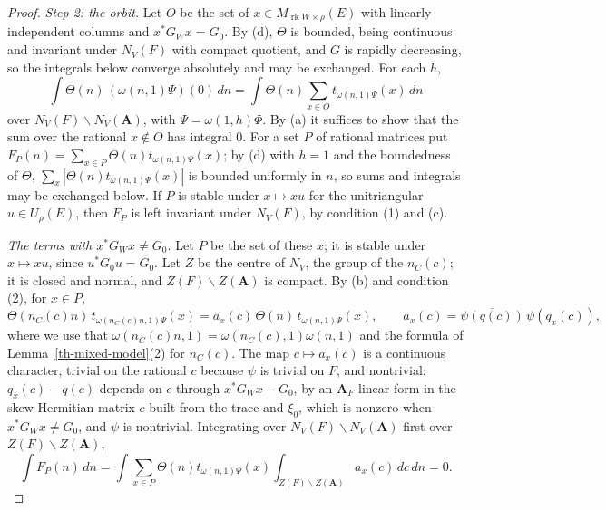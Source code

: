 \begin{proof}
\emph{Step 2: the orbit.} Let $O$ be the set of
$x\in M_{\operatorname{rk}W\times\rho}(E)$ with linearly independent columns
and $x^*G_Wx=G_0$. By (d), $\Theta$ is bounded, being continuous and invariant
under $N_V(F)$ with compact quotient, and $G$ is rapidly decreasing, so the
integrals below converge absolutely and may be exchanged. For each $h$,
\[
\int\Theta(n)\,(\omega(n,1)\Psi)(0)\,dn=\int\Theta(n)\sum_{x\in O}t_{\omega(n,1)\Psi}(x)\,dn
\]
over $N_V(F)\backslash N_V(\mathbf A)$, with $\Psi=\omega(1,h)\Phi$. By (a) it
suffices to show that the sum over the rational $x\notin O$ has integral $0$.
For a set $P$ of rational matrices put
$F_P(n)=\sum_{x\in P}\Theta(n)t_{\omega(n,1)\Psi}(x)$; by (d) with $h=1$ and the
boundedness of $\Theta$, $\sum_x|\Theta(n)t_{\omega(n,1)\Psi}(x)|$ is bounded
uniformly in $n$, so sums and integrals may be exchanged below. If $P$ is
stable under $x\mapsto xu$ for the unitriangular $u\in U_\rho(E)$, then $F_P$ is
left invariant under $N_V(F)$, by condition (1) and (c).

\emph{The terms with $x^*G_Wx\neq G_0$.} Let $P$ be the set of these $x$; it is
stable under $x\mapsto xu$, since $u^*G_0u=G_0$. Let $Z$ be the centre of
$N_V$, the group of the $n_C(c)$; it is closed and normal, and $Z(F)\backslash
Z(\mathbf A)$ is compact. By (b) and condition (2), for $x\in P$,
\[
\Theta(n_C(c)n)\,t_{\omega(n_C(c)n,1)\Psi}(x)=a_x(c)\,\Theta(n)\,t_{\omega(n,1)\Psi}(x),\qquad
a_x(c)=\overline{\psi(q(c))}\,\psi(q_x(c)),
\]
where we use that $\omega(n_C(c)n,1)=\omega(n_C(c),1)\omega(n,1)$ and the formula
of Lemma~\ref{th-mixed-model}(2) for $n_C(c)$. The map $c\mapsto a_x(c)$ is a
continuous character, trivial on the rational $c$ because $\psi$ is trivial on
$F$, and nontrivial: $q_x(c)-q(c)$ depends on $c$ through
$x^*G_Wx-G_0$, by an $\mathbf A_F$-linear form in the skew-Hermitian matrix $c$
built from the trace and $\xi_0$, which is nonzero when $x^*G_Wx\neq G_0$, and
$\psi$ is nontrivial. Integrating over
$N_V(F)\backslash N_V(\mathbf A)$ first over $Z(F)\backslash Z(\mathbf A)$,
\[
\int F_P(n)\,dn=\int\sum_{x\in P}\Theta(n)t_{\omega(n,1)\Psi}(x)\int_{Z(F)\backslash Z(\mathbf A)}a_x(c)\,dc\,dn=0 .
\]


\end{proof}
